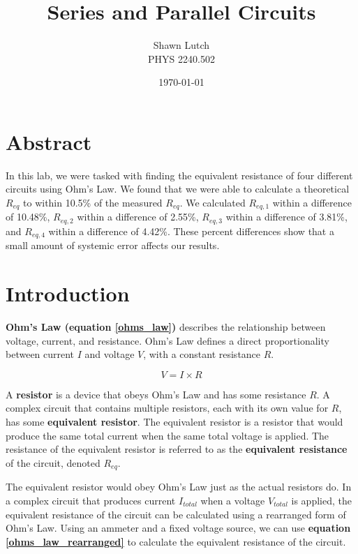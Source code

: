 \documentclass[12pt,letterpaper,titlepage]{report}
\newcommand{\myTitle}{Series and Parallel Circuits}
\newcommand{\myName}{Shawn Lutch}
\newcommand{\myPeriod}{PHYS 2240.502}
\begin{document}


\title{\myTitle{}}
\author{\myName{}\\ \myPeriod{}}
\date{\today}
\maketitle




\section*{Abstract}

In this lab, we were tasked with finding the equivalent resistance of four different circuits using Ohm's Law. We found that we were able to calculate a theoretical $R_{eq}$ to within  10.5\% of the measured $R_{eq}$. We calculated $R_{eq, 1}$ within a difference of 10.48\%, $R_{eq, 2}$ within a difference of 2.55\%, $R_{eq, 3}$ within a difference of 3.81\%, and $R_{eq, 4}$ within a difference of 4.42\%. These percent differences show that a small amount of systemic error affects our results.



\bigskip
\section*{Introduction}

\textbf{Ohm's Law (equation \ref{ohms_law})} describes the relationship between voltage, current, and resistance. Ohm's Law defines a direct proportionality between current $I$ and voltage $V$, with a constant resistance $R$.

\begin{equation} \label{ohms_law}
V = I \times R
\end{equation}

A \textbf{resistor} is a device that obeys Ohm's Law and has some resistance $R$. A complex circuit that contains multiple resistors, each with its own value for $R$, has some \textbf{equivalent resistor}. The equivalent resistor is a resistor that would produce the same total current when the same total voltage is applied. The resistance of the equivalent resistor is referred to as the \textbf{equivalent resistance} of the circuit, denoted $R_{eq}$.

\medskip
The equivalent resistor would obey Ohm's Law just as the actual resistors do. In a complex circuit that produces current $I_{total}$ when a voltage $V_{total}$ is applied, the equivalent resistance of the circuit can be calculated using a rearranged form of Ohm's Law. Using an ammeter and a fixed voltage source, we can use \textbf{equation \ref{ohms_law_rearranged}} to calculate the equivalent resistance of the circuit.
\end{document}
